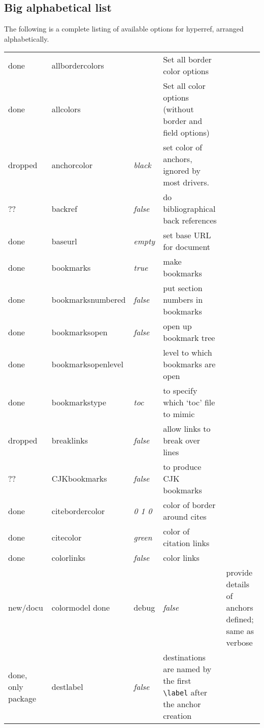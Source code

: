 \subsection{Big alphabetical list}

The following is a complete listing of available options for
\textsf{hyperref}, arranged alphabetically.

\begin{longtable}{@{}l>{\ttfamily}llp{7cm}@{}}
done    & allbordercolors    &                        & Set all border color options\\
done    & allcolors          &                        & Set all color options (without border and field options)\\
dropped & anchorcolor        & \textit{black}         & set color of anchors, ignored by most drivers. \\
??      & backref            & \textit{false}         & do bibliographical back references \\
done    & baseurl            & \textit{empty}         & set base URL for document \\
done    & bookmarks          & \textit{true}          & make bookmarks \\
done    & bookmarksnumbered  & \textit{false}         & put section numbers in bookmarks \\
done    & bookmarksopen      & \textit{false}         & open up bookmark tree \\
done    & bookmarksopenlevel & \ttfamily{} & level to which bookmarks are open \\
done    & bookmarkstype      & \textit{toc}           & to specify which `toc' file to mimic \\
dropped & breaklinks         & \textit{false}         & allow links to break over lines \\
?? & CJKbookmarks       & \textit{false}         & to produce CJK bookmarks\\
done & citebordercolor    & \textit{0 1 0}         & color of border around cites \\
done & citecolor          & \textit{green}         & color of citation links \\
done & colorlinks         & \textit{false}         & color links \\
new/docu  & colormodel
done   & debug              & \textit{false}         & provide details of anchors defined; same as verbose \\
done, only package   & destlabel          & \textit{false}         & destinations are named by the first \verb|\label| after the anchor creation \\

\end{longtable}
